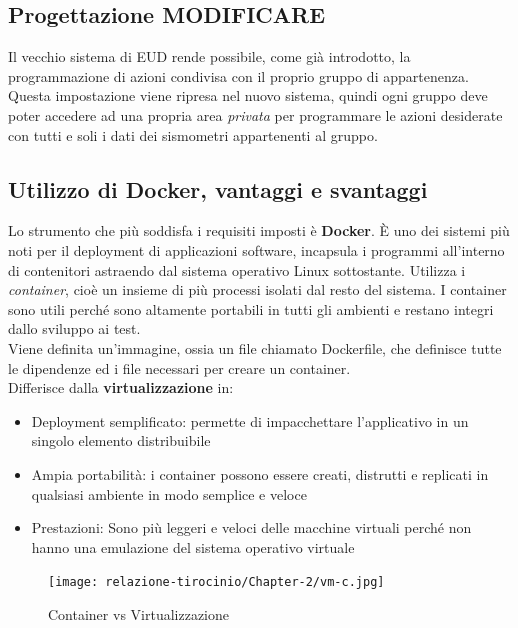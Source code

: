 \documentclass[a4paper,10pt]{memoir}
\begin{document}
\subsection{Progettazione MODIFICARE}
Il vecchio sistema di EUD rende possibile, come già introdotto, la programmazione di azioni condivisa con il proprio gruppo di appartenenza.
\\
Questa impostazione viene ripresa nel nuovo sistema, quindi ogni gruppo deve poter accedere ad una propria area \textit{privata} per programmare le azioni desiderate con tutti e soli i dati dei sismometri appartenenti al gruppo.

\clearpage

\subsection{Utilizzo di Docker, vantaggi e svantaggi}

Lo strumento che più soddisfa i requisiti imposti è \textbf{Docker}.
È uno dei sistemi più noti per il deployment di applicazioni software, incapsula i programmi all'interno di contenitori astraendo dal sistema operativo Linux sottostante.
Utilizza i \textit{container}, cioè un insieme di più processi isolati dal resto del sistema.
I container sono utili perché sono altamente portabili in tutti gli ambienti e restano integri dallo sviluppo ai test.
\\
Viene definita un'immagine, ossia un file chiamato Dockerfile, che definisce tutte le dipendenze ed i file necessari per creare un container.
\\
Differisce dalla \textbf{virtualizzazione} in:
\begin{itemize}
    \item Deployment semplificato: permette di impacchettare l'applicativo in un singolo elemento distribuibile
    \item Ampia portabilità: i container possono essere creati, distrutti e replicati in qualsiasi ambiente in modo semplice e veloce
    \item Prestazioni: Sono più leggeri e veloci delle macchine virtuali perché non hanno una emulazione del sistema operativo virtuale
\end{itemize}
\begin{figure}[H]
\caption{Container vs Virtualizzazione}
\texttt{[image: relazione-tirocinio/Chapter-2/vm-c.jpg]}
\end{figure}


\clearpage
\end{document}
